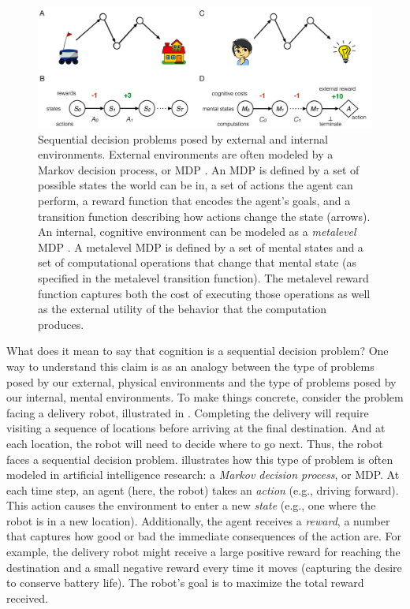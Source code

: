 \documentclass[dsingle]{memo}
\begin{document}
\begin{figure}[tbp]
  \centering
  \includegraphics[width=\textwidth]{diagrams/precis/intro.pdf}
  \caption{Sequential decision problems posed by external and internal environments. 
  External environments  are often modeled by a Markov decision process, or MDP . An MDP is defined by a set of possible states the world can be in, a set of actions the agent can perform, a reward function that encodes the agent's goals, and a transition function describing how actions change the state (arrows). An internal, cognitive environment  can be modeled as a \emph{metalevel} MDP . A metalevel MDP is defined by a set of mental states and a set of computational operations that change that mental state (as specified in the metalevel transition function). The metalevel reward function captures both the cost of executing those operations as well as the external utility of the behavior that the computation produces.}
  \label{fig:sequential-intuition}
\end{figure}

What does it mean to say that cognition is a sequential decision problem? One way to understand this claim is as an analogy between the type of problems posed by our external, physical environments and the type of problems posed by our internal, mental environments. To make things concrete, consider the problem facing a delivery robot, illustrated in . Completing the delivery will require visiting a sequence of locations before arriving at the final destination. And at each location, the robot will need to decide where to go next. Thus, the robot faces a sequential decision problem.  illustrates how this type of problem is often modeled in artificial intelligence research: a \emph{Markov decision process}, or MDP. At each time step, an agent (here, the robot) takes an \emph{action} (e.g., driving forward). This action causes the environment to enter a new \emph{state} (e.g., one where the robot is in a new location). Additionally, the agent receives a \emph{reward}, a number that captures how good or bad the immediate consequences of the action are. For example, the delivery robot might receive a large positive reward for reaching the destination and a small negative reward every time it moves (capturing the desire to conserve battery life). The robot's goal is to maximize the total reward received.
\end{document}
